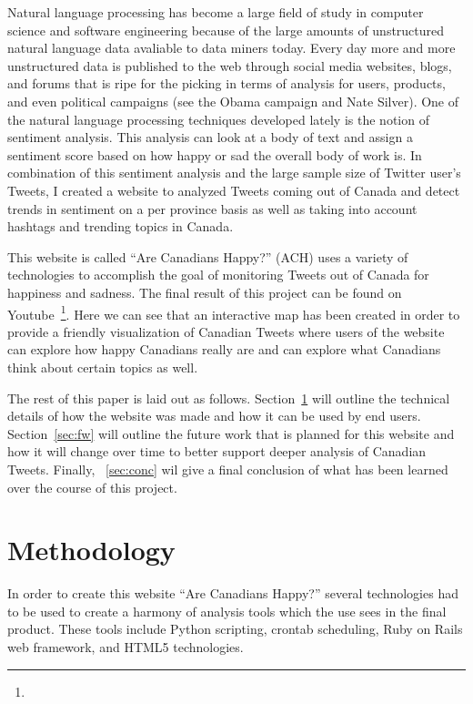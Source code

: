 \documentclass[conference]{IEEEtran}
\begin{document}
Natural language processing has become a large field of study in computer science and software engineering
because of the large amounts of unstructured natural language data avaliable to data miners today. Every day
more and more unstructured data is published to the web through social media websites, blogs, and forums 
that is ripe for the picking in terms of analysis for users, products, and even political campaigns (see
the Obama campaign and Nate Silver). One of the natural language processing techniques developed lately is
the notion of sentiment analysis. This analysis can look at a body of text and assign a sentiment score based
on how happy or sad the overall body of work is. In combination of this sentiment analysis and the large
sample size of Twitter user's Tweets, I created a website to analyzed Tweets coming out of Canada and detect
trends in sentiment on a per province basis as well as taking into account hashtags and trending topics 
in Canada.

This website is called ``Are Canadians Happy?'' (ACH) uses a variety of technologies to accomplish the
goal of monitoring Tweets out of Canada for happiness and sadness. The final result of this project can
be found on Youtube~\footnote{}. Here we can see that an interactive map has been created in order to
provide a friendly visualization of Canadian Tweets where users of the website can explore how happy 
Canadians really are and can explore what Canadians think about certain topics as well.

The rest of this paper is laid out as follows. Section~\ref{sec:meth} will outline the technical details
of how the website was made and how it can be used by end users. Section~\ref{sec:fw} will outline
the future work that is planned for this website and how it will change over time to better support
deeper analysis of Canadian Tweets. Finally, ~\ref{sec:conc} wil give a final conclusion of what has 
been learned over the course of this project.

\section{Methodology}
\label{sec:meth}

In order to create this website ``Are Canadians Happy?'' several technologies had to be used to create 
a harmony of analysis tools which the use sees in the final product. These tools include Python scripting,
crontab scheduling, Ruby on Rails web framework, and HTML5 technologies.
\end{document}
